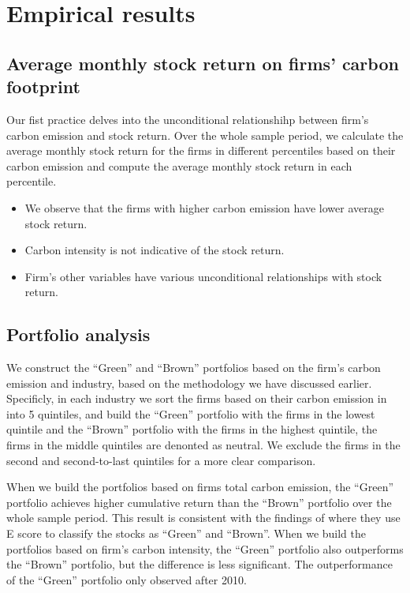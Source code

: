 \documentclass[12pt]{article}
\begin{document}
\section{Empirical results}
\subsection{Average monthly stock return on firms' carbon footprint}

Our fist practice delves into the unconditional relationshihp between firm's carbon emission and stock return. Over the whole sample period, we calculate the average monthly stock return for the firms in different percentiles based on their carbon emission and compute the average monthly stock return in each percentile.

\begin{itemize}
    \item We observe that the firms with higher carbon emission have lower average stock return.
    \item Carbon intensity is not indicative of the stock return.
    \item Firm's other variables have various unconditional relationships with stock return.
\end{itemize}

\subsection{Portfolio analysis}
We construct the ``Green'' and ``Brown'' portfolios based on the firm's carbon emission and industry, based on the methodology we have discussed earlier. Specificly, in each industry we sort the firms based on their carbon emission in into 5 quintiles, and build the ``Green'' portfolio with the firms in the lowest quintile and the ``Brown'' portfolio with the firms in the highest quintile, the firms in the middle quintiles are denonted as neutral. We exclude the firms in the second and second-to-last quintiles for a more clear comparison. 

When we build the portfolios based on firms total carbon emission, the ``Green'' portfolio achieves higher cumulative return than the ``Brown'' portfolio over the whole sample period. This result is consistent with the findings of \cite{pastor2022dissecting} where they use E score to classify the stocks as ``Green'' and ``Brown''. When we build the portfolios based on firm's carbon intensity, the ``Green'' portfolio also outperforms the ``Brown'' portfolio, but the difference is less significant. The outperformance of the ``Green'' portfolio only observed after 2010.
\end{document}
